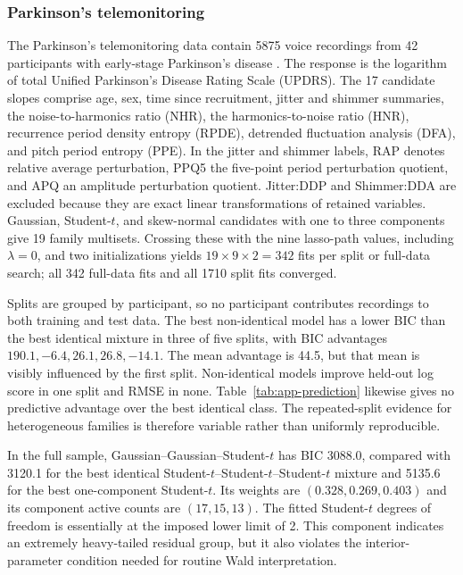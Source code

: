 \documentclass[a4paper,fleqn]{cas-sc}
\begin{document}
\subsubsection{Parkinson's telemonitoring}

The Parkinson's telemonitoring data contain 5875 voice recordings from 42 participants with early-stage Parkinson's disease \citep{uci2009parkinsons,tsanas2010parkinsons}. The response is the logarithm of total Unified Parkinson's Disease Rating Scale (UPDRS). The 17 candidate slopes comprise age, sex, time since recruitment, jitter and shimmer summaries, the noise-to-harmonics ratio (NHR), the harmonics-to-noise ratio (HNR), recurrence period density entropy (RPDE), detrended fluctuation analysis (DFA), and pitch period entropy (PPE). In the jitter and shimmer labels, RAP denotes relative average perturbation, PPQ5 the five-point period perturbation quotient, and APQ an amplitude perturbation quotient. Jitter:DDP and Shimmer:DDA are excluded because they are exact linear transformations of retained variables. Gaussian, Student-$t$, and skew-normal candidates with one to three components give 19 family multisets. Crossing these with the nine lasso-path values, including $\lambda=0$, and two initializations yields $19\times9\times2=342$ fits per split or full-data search; all 342 full-data fits and all 1710 split fits converged.

Splits are grouped by participant, so no participant contributes recordings to both training and test data. The best non-identical model has a lower BIC than the best identical mixture in three of five splits, with BIC advantages $190.1,-6.4,26.1,26.8,-14.1$. The mean advantage is 44.5, but that mean is visibly influenced by the first split. Non-identical models improve held-out log score in one split and RMSE in none. Table~\ref{tab:app-prediction} likewise gives no predictive advantage over the best identical class. The repeated-split evidence for heterogeneous families is therefore variable rather than uniformly reproducible.

In the full sample, Gaussian--Gaussian--Student-$t$ has BIC 3088.0, compared with 3120.1 for the best identical Student-$t$--Student-$t$--Student-$t$ mixture and 5135.6 for the best one-component Student-$t$. Its weights are $(0.328,0.269,0.403)$ and its component active counts are $(17,15,13)$. The fitted Student-$t$ degrees of freedom is essentially at the imposed lower limit of 2. This component indicates an extremely heavy-tailed residual group, but it also violates the interior-parameter condition needed for routine Wald interpretation.
\end{document}
